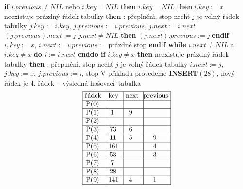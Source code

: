 {\bf if} $i.previous\ne NIL$ nebo $i.key= NIL$ {\bf then}\newline
\phantom{---}{\bf if} $i.key=NIL$ {\bf then}\newline 
\phantom{------}$i.key:=x$\newline 
\phantom{---}{\bf else}\newline 
\phantom{------}{\bf if} neexistuje pr\'azdn\'y \v r\'adek tabulky {\bf then}\newline 
\phantom{---------}{\bf V\'ystup}: p\v repln\v en\'\i , stop\newline 
\phantom{------}{\bf else}\newline 
\phantom{---------}nech\v t $j$ je voln\'y \v r\'adek tabulky\newline 
\phantom{---------}$j.key:=i.key$, $j.previous:=i.previous$, $j.next
:=i.next$\newline 
\phantom{---------}$(j.previous).next:=j$\newline 
\phantom{---------}{\bf if} $j.next\ne NIL$ {\bf then} $(j.next).previous:=j$ {\bf endif}\newline 
\phantom{---------}$i,key:=x$, $i.next:=i.previous:=$pr\'azdn\'e\newline 
\phantom{------}{\bf endif}\newline 
\phantom{---}{\bf endif}\newline
\phantom{---}stop\newline
{\bf endif\newline
while} $i.next\ne NIL$ a $i.key\ne x$ {\bf do} $i:=i.next$ {\bf enddo\newline 
if} $i.key\ne x$ {\bf then}\newline 
\phantom{---}{\bf if} neexistuje pr\'azdn\'y \v r\'adek tabulky {\bf then}\newline 
\phantom{------}{\bf V\'ystup}: p\v repln\v en\'\i , stop\newline 
\phantom{---}{\bf else}\newline 
\phantom{------}nech\v t $j$ je voln\'y \v r\'adek tabulky\newline 
\phantom{------}$i.next:=j$, $j.key:=x$, $j.previous:=i$, stop\newline 
\phantom{---}{\bf endif\newline 
endif\newline 
endif}
\bigskip
\flushpar V p\v r\'\i kladu provedeme {\bf INSERT$(28)$}, nov\'y \v r\'adek je 4. \v r\'adek\newline 
-- v\'ysledn\'a ha\v sovac\'\i\ tabulka
$$\vtop{\offinterlineskip\halign {\strut\vrule\ # & \vrule\ # & \vrule\ # & \vrule \hfil # \hfil \vrule\cr\noalign{\hrule}\v r\'adek & key & next & previous\hfil \cr\noalign{\hrule}P(0) & & &\hfill \cr\noalign{\hrule}P(1) & 1 & 9 &\hfill \cr\noalign{\hrule}P(2) & & &\hfill \cr\noalign{\hrule}P(3) & 73 & 6 &\hfill \cr\noalign{\hrule}P(4) & 11 & 5 & 9 \cr\noalign{\hrule}P(5) & 161 & & 4 \cr\noalign{\hrule}P(6) & 53 & & 3 \cr\noalign{\hrule}P(7) & 7 & &\hfill \cr\noalign{\hrule}P(8) & 28 &  &\hfill  \cr\noalign{\hrule}P(9) & 141 & 4 & 1 \cr\noalign{\hrule}}}$$

